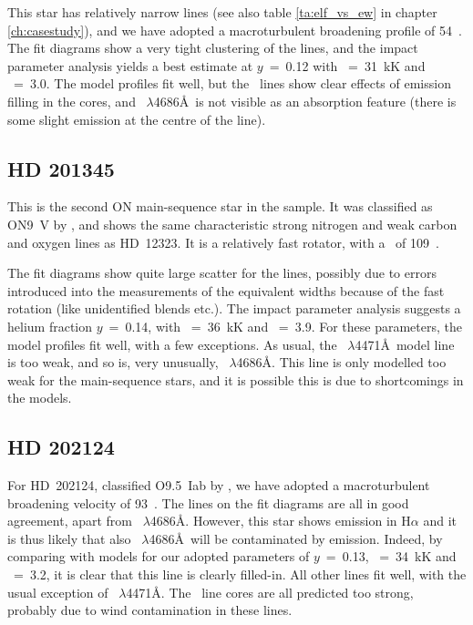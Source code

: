 This star has relatively narrow lines (see also table
\ref{ta:elf_vs_ew} in chapter \ref{ch:casestudy}), and 
we have adopted a macroturbulent broadening profile of 54~\kms. The
fit diagrams show a very tight clustering of the lines, and the impact
parameter analysis yields a best estimate at $y$~=~0.12 with
\teff~=~31~kK and \logg~=~3.0. The model profiles fit well, but the
\hi\ lines show clear effects of emission filling in the cores, and
\heii~$\lambda$4686\AA\ is not visible as an absorption feature (there
is some slight emission at the centre of the line).

\subsection{HD 201345}  %
\label{analysis:hd201345}

This is the second ON main-sequence star in the sample. It was
classified as ON9~V by , and shows the same
characteristic strong nitrogen and weak carbon and oxygen lines as
HD~12323.  It is a relatively fast rotator, with a \vsini\ of
109~\kms.

The fit diagrams show quite large scatter for the lines, possibly due
to errors introduced into the measurements of the equivalent widths
because of the fast rotation (like unidentified blends etc.). The
impact parameter analysis suggests a helium fraction $y$~=~0.14, with
\teff~=~36~kK and \logg~=~3.9. For these parameters, the model
profiles fit well, with a few exceptions. As usual, the 
\hei~$\lambda$4471\AA\ model line is too weak, and so is, very unusually,
\heii~$\lambda$4686\AA. This line is only modelled too weak for the
main-sequence stars, and it is possible this is due to shortcomings in
the models.


\subsection{HD 202124}  %
\label{analysis:hd202124}
For HD~202124, classified O9.5~Iab by , we have adopted
a macroturbulent broadening velocity of 93~\kms. The lines on the fit
diagrams are all in good agreement, apart from
\heii~$\lambda$4686\AA. However, this star shows emission in H$\alpha$
and it is thus likely that also \heii~$\lambda$4686\AA\ will be
contaminated by emission. Indeed, by comparing with models for our
adopted parameters of $y$~=~0.13, \teff~=~34~kK and \logg~=~3.2, it is
clear that this line is clearly filled-in. All other lines fit well,
with the usual exception of \hei~$\lambda$4471\AA. The \hi\ line cores
are all predicted too strong, probably due to wind contamination in
these lines.


